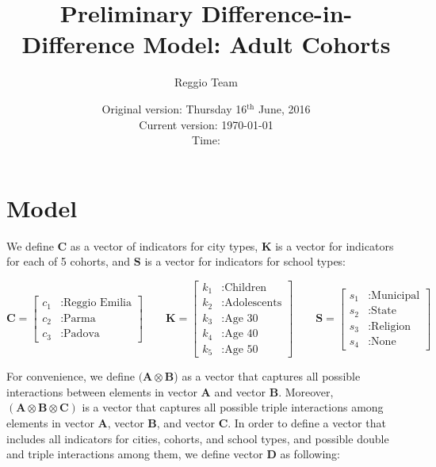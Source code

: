 \documentclass[11pt]{article}
\begin{document}
\title{Preliminary Difference-in-Difference Model: Adult Cohorts}
\author{Reggio Team}
\date{Original version: Thursday  16$^{\text{th}}$ June, 2016 \\ Current version: \today \\ \vspace{1em} Time: \currenttime}
\maketitle

\doublespacing

\section{Model}


We define $\mathbf{C}$ as a vector of indicators for city types, $\mathbf{K}$ is a vector for indicators for each of 5 cohorts, and  $\mathbf{S}$ is a vector for indicators for school types: 

\begin{equation*}
\mathbf{C} =\begin{bmatrix} c_1 & : \text{Reggio Emilia} \\
c_2 & : \text{Parma} \\
c_3 & : \text{Padova} 
\end{bmatrix} \qquad \mathbf{K} =\begin{bmatrix} k_1 & : \text{Children} \\
k_2 & : \text{Adolescents} \\
k_3 & : \text{Age 30}  \\
k_4 & : \text{Age 40} \\
k_5 & : \text{Age 50} 
\end{bmatrix} \qquad \mathbf{S} =\begin{bmatrix} s_1 & : \text{Municipal} \\
s_2 & : \text{State} \\
s_3 & : \text{Religion}  \\
s_4 & : \text{None} 
\end{bmatrix}
\end{equation*}

For convenience, we define $(\mathbf{A} \otimes \mathbf{B}$) as a vector that captures all possible interactions between elements in vector $\mathbf{A}$ and vector $\mathbf{B}$. Moreover, $(\mathbf{A} \otimes \mathbf{B} \otimes \mathbf{C})$ is a vector that captures all possible triple interactions among elements in vector $\mathbf{A}$, vector $\mathbf{B}$, and vector $\mathbf{C}$. In order to define a vector that includes all indicators for cities, cohorts, and school types, and possible double and triple interactions among them, we define vector $\mathbf{D}$ as following:
\end{document}
